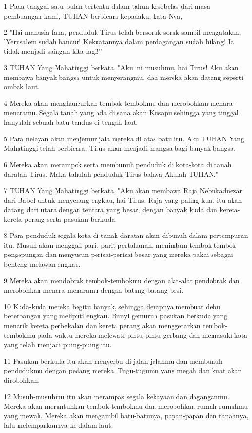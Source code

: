 \par 1 Pada tanggal satu bulan tertentu dalam tahun kesebelas dari masa pembuangan kami, TUHAN berbicara kepadaku, kata-Nya,
\par 2 "Hai manusia fana, penduduk Tirus telah bersorak-sorak sambil mengatakan, 'Yerusalem sudah hancur! Kekuatannya dalam perdagangan sudah hilang! Ia tidak menjadi saingan kita lagi!'"
\par 3 TUHAN Yang Mahatinggi berkata, "Aku ini musuhmu, hai Tirus! Aku akan membawa banyak bangsa untuk menyerangmu, dan mereka akan datang seperti ombak laut.
\par 4 Mereka akan menghancurkan tembok-tembokmu dan merobohkan menara-menaramu. Segala tanah yang ada di sana akan Kusapu sehingga yang tinggal hanyalah sebuah batu tandus di tengah laut.
\par 5 Para nelayan akan menjemur jala mereka di atas batu itu. Aku TUHAN Yang Mahatinggi telah berbicara. Tirus akan menjadi mangsa bagi banyak bangsa.
\par 6 Mereka akan merampok serta membunuh penduduk di kota-kota di tanah daratan Tirus. Maka tahulah penduduk Tirus bahwa Akulah TUHAN."
\par 7 TUHAN Yang Mahatinggi berkata, "Aku akan membawa Raja Nebukadnezar dari Babel untuk menyerang engkau, hai Tirus. Raja yang paling kuat itu akan datang dari utara dengan tentara yang besar, dengan banyak kuda dan kereta-kereta perang serta pasukan berkuda.
\par 8 Para penduduk segala kota di tanah daratan akan dibunuh dalam pertempuran itu. Musuh akan menggali parit-parit pertahanan, menimbun tembok-tembok pengepungan dan menyusun perisai-perisai besar yang mereka pakai sebagai benteng melawan engkau.
\par 9 Mereka akan mendobrak tembok-tembokmu dengan alat-alat pendobrak dan merobohkan menara-menaramu dengan batang-batang besi.
\par 10 Kuda-kuda mereka begitu banyak, sehingga derapnya membuat debu beterbangan yang meliputi engkau. Bunyi gemuruh pasukan berkuda yang menarik kereta perbekalan dan kereta perang akan menggetarkan tembok-tembokmu pada waktu mereka melewati pintu-pintu gerbang dan memasuki kota yang telah menjadi puing-puing itu.
\par 11 Pasukan berkuda itu akan menyerbu di jalan-jalanmu dan membunuh pendudukmu dengan pedang mereka. Tugu-tugumu yang megah dan kuat akan dirobohkan.
\par 12 Musuh-musuhmu itu akan merampas segala kekayaan dan daganganmu. Mereka akan meruntuhkan tembok-tembokmu dan merobohkan rumah-rumahmu yang mewah. Mereka akan mengambil batu-batunya, papan-papan dan tanahnya, lalu melemparkannya ke dalam laut.
